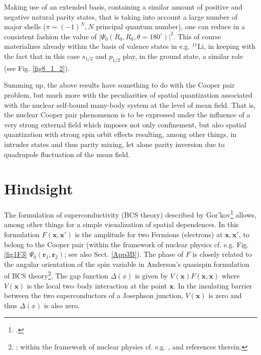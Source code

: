 Making use of an extended basis, containing a similar amount of positive and negative natural parity states, that is taking into account a large number of major shells ($\pi=(-1)^N, N$ principal quantum number), one can reduce in a consistent fashion the value of $|\Psi_0(R_0,R_0,\theta=180^\circ)|^2$.
This of course materializes already within the basis of valence states in e.g. $^{11}$Li, in keeping with the fact that in this case $s_{1/2}$ and $p_{1/2}$ play, in the ground state, a similar role (see Fig. \ref{fig8_1_2}). 


Summing up, the above results have something to do with the Cooper pair problem, but much more with the peculiarities of spatial quantization associated with the nuclear self-bound many-body system at the level of mean field. That is, the nuclear Cooper pair phenomenon  is to be expressed under the influence of a very strong external field which imposes not only confinement, but also spatial quantization with strong spin orbit effects resulting, among other things, in intruder states and thus parity mixing, let alone parity inversion due to quadrupole fluctuation of the mean field.   

\section{Hindsight}\label{C3AppE}
The formulation of superconductivity (BCS theory) described by  Gor'kov\footnote{\cite{Gorkov:58,Gorkov:59}.} allows, among other things for a simple visualization of spatial dependences. In this formulation $F(\mathbf{x},\mathbf{x}')$ is the amplitude for two Fermions (electrons) at $\mathbf{x},\mathbf{x}'$, to belong to the Cooper pair (within the framework of nuclear physics cf. e.g. Fig. \ref{fig1F3} $\Psi_0(\mathbf{r}_1,\mathbf{r}_2)$; see also Sect. \ref{App3B}). The phase of $F$ is closely  related to the angular orientation of the spin variable  in Anderson's quasispin formulation of BCS theory\footnote{\cite{Anderson:58b}; within the framework of nuclear physics cf. e.g. \cite{Bohr:88}, \cite{Potel:13b} and references therein.}. The gap function $\Delta(x)$ is given by $V(\mathbf{x})F(\mathbf{x},\mathbf{x})$ where $V(\mathbf{x})$ is the local two--body interaction at the point $\mathbf x$. In the insulating barrier between the two superconductors of a Josephson junction, $V(\mathbf{x})$ is zero and thus $\Delta(x)$ is also zero. 



